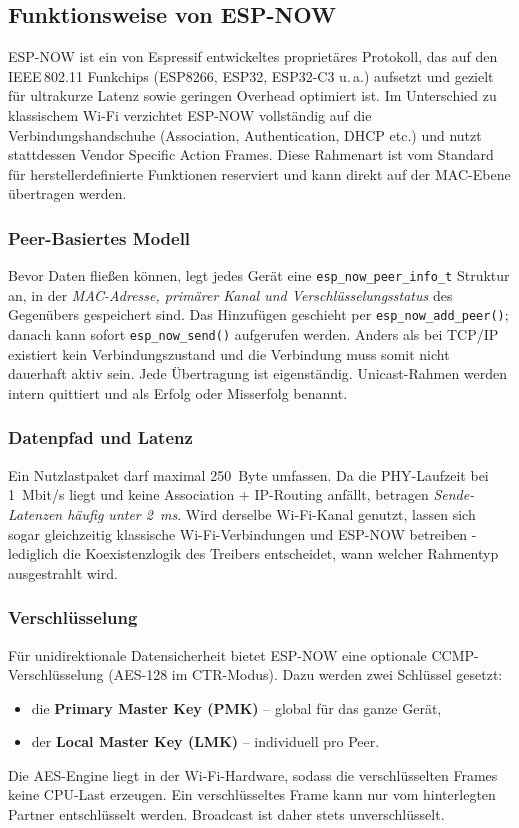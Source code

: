 \documentclass[a4paper,12pt]{article}
\begin{document}
\subsection{Funktionsweise von ESP-NOW}
\label{sec:ESPNOW_Funktionsweise}

ESP-NOW ist ein von Espressif entwickeltes proprietäres Protokoll, das auf den \mbox{IEEE\,802.11} Funkchips (ESP8266, ESP32, ESP32-C3 u.\,a.) aufsetzt und gezielt für ultrakurze Latenz sowie geringen Overhead optimiert ist.  Im Unterschied zu klassischem Wi-Fi verzichtet ESP-NOW vollständig auf die Verbindungshandschuhe (Association, Authentication, DHCP etc.) und nutzt stattdessen Vendor Specific Action Frames.  Diese Rahmenart ist vom Standard für herstellerdefinierte Funktionen reserviert und kann direkt auf der MAC-Ebene übertragen werden.  

\subsubsection*{Peer-Basiertes Modell}
Bevor Daten fließen können, legt jedes Gerät eine \verb|esp_now_peer_info_t| Struktur an, in der \emph{MAC-Adresse, primärer Kanal und Verschlüsselungsstatus} des Gegenübers gespeichert sind.  Das Hinzufügen geschieht per \verb|esp_now_add_peer()|; danach kann sofort \verb|esp_now_send()| aufgerufen werden.  Anders als bei TCP/IP existiert kein Verbindungszustand und die Verbindung muss somit nicht dauerhaft aktiv sein. Jede Übertragung ist eigenständig. Unicast-Rahmen werden intern quittiert und als Erfolg oder Misserfolg benannt.

\subsubsection*{Datenpfad und Latenz}
Ein Nutzlastpaket darf maximal \SI{250}{Byte} umfassen. Da die PHY-Laufzeit bei \SI{1}{Mbit/s} liegt und keine Association + IP-Routing anfällt, betragen \emph{Sende-Latenzen häufig unter \SI{2}{ms}}. Wird derselbe Wi-Fi-Kanal genutzt, lassen sich sogar gleichzeitig klassische Wi-Fi-Verbindungen und ESP-NOW betreiben - lediglich die Koexistenzlogik des Treibers entscheidet, wann welcher Rahmentyp ausgestrahlt wird.

\subsubsection*{Verschlüsselung}
Für unidirektionale Datensicherheit bietet ESP-NOW eine optionale CCMP-Verschlüsselung (AES-128 im CTR-Modus). Dazu werden zwei Schlüssel gesetzt:
\begin{itemize}
  \item die \textbf{Primary Master Key (PMK)} – global für das ganze Gerät,
  \item der \textbf{Local Master Key (LMK)} – individuell pro Peer.
\end{itemize}
Die AES-Engine liegt in der Wi-Fi-Hardware, sodass die verschlüsselten Frames keine CPU-Last erzeugen.  Ein verschlüsseltes Frame kann nur vom hinterlegten Partner entschlüsselt werden. Broadcast ist daher stets unverschlüsselt.
\end{document}
